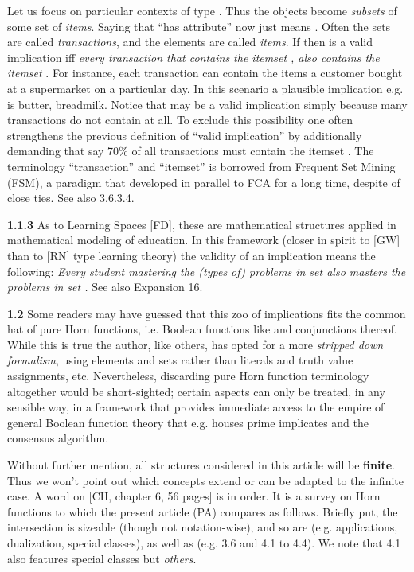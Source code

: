 \documentclass[11pt]{article}
\begin{document}
Let us focus on particular contexts of type . Thus the objects  become {\it subsets}  of some set  of {\it items}. Saying that  ``has attribute''  now just means . Often the sets  are called {\it transactions}, and the elements  are called {\it items}. 
If  then   is a valid implication iff {\it every transaction  that contains the itemset , also contains the itemset }. For instance, each transaction can contain the items a customer  bought at a supermarket on a particular day. In this scenario a plausible implication e.g. is butter, breadmilk. Notice that  may be a valid implication simply because many transactions do not contain  at all. To exclude this possibility one often strengthens the previous definition of ``valid implication'' by additionally demanding that say 70\% of all transactions must contain the itemset . The terminology ``transaction'' and ``itemset'' is borrowed from Frequent Set Mining (FSM), a paradigm that developed in parallel to FCA for a long time, despite of close ties.  See also 3.6.3.4.

{\bf 1.1.3} As to Learning Spaces [FD], these are mathematical structures applied in mathematical modeling of education. In this framework (closer in spirit to [GW] than to [RN] type learning theory) the validity of an implication  means the following: {\it Every student mastering the (types of) problems in set  also masters the problems in set .} See also Expansion 16.



{\bf 1.2} Some readers may have guessed that this zoo of implications fits the common hat of pure Horn functions, i.e. Boolean functions like  and conjunctions thereof. While this is true the author, like others, has opted for a more {\it stripped down formalism}, using elements and sets rather than literals and truth value assignments, etc. Nevertheless, discarding pure Horn function terminology altogether would be short-sighted; certain aspects can only be treated, in any sensible way, in a framework that provides immediate access to the empire of general Boolean function theory that e.g. houses prime implicates and the consensus algorithm.

Without further mention, all structures considered in this article will be {\bf finite}. Thus we won't point out which concepts extend or can be adapted to the infinite case. A word on [CH, chapter 6, 56 pages] is in order. It is a survey on Horn functions to which the present article (PA) compares as follows. Briefly put, the intersection  is sizeable (though not notation-wise), and so are  (e.g. applications, dualization, special classes), as well as  (e.g. 3.6 and 4.1 to 4.4). We note that 4.1 also features special classes but {\it others}.
\end{document}
